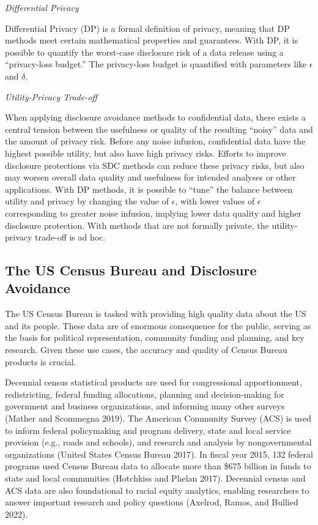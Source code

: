 \documentclass[
]{urban-formatting}
\begin{document}
\emph{Differential Privacy}

Differential Privacy (DP) is a formal definition of privacy, meaning
that DP methods meet certain mathematical properties and guarantees.
With DP, it is possible to quantify the worst-case disclosure risk of a
data release using a ``privacy-loss budget.'' The privacy-loss budget is
quantified with parameters like \(\epsilon\) and \(\delta\).

\emph{Utility-Privacy Trade-off}

When applying disclosure avoidance methods to confidential data, there
exists a central tension between the usefulness or quality of the
resulting ``noisy'' data and the amount of privacy risk. Before any
noise infusion, confidential data have the highest possible utility, but
also have high privacy risks. Efforts to improve disclosure protections
via SDC methods can reduce these privacy risks, but also may worsen
overall data quality and usefulness for intended analyses or other
applications. With DP methods, it is possible to ``tune'' the balance
between utility and privacy by changing the value of \(\epsilon\), with
lower values of \(\epsilon\) corresponding to greater noise infusion,
implying lower data quality and higher disclosure protection. With
methods that are not formally private, the utility-privacy trade-off is
ad hoc.

\subsection{The US Census Bureau and Disclosure Avoidance}

The US Census Bureau is tasked with providing high quality data about
the US and its people. These data are of enormous consequence for the
public, serving as the basis for political representation, community
funding and planning, and key research. Given these use cases, the
accuracy and quality of Census Bureau products is crucial.

Decennial census statistical products are used for congressional
apportionment, redistricting, federal funding allocations, planning and
decision-making for government and business organizations, and informing
many other surveys (Mather and Scommegna 2019). The American Community
Survey (ACS) is used to inform federal policymaking and program
delivery, state and local service provision (e.g., roads and schools),
and research and analysis by nongovernmental organizations (United
States Census Bureau 2017). In fiscal year 2015, 132 federal programs
used Census Bureau data to allocate more than \$675 billion in funds to
state and local communities (Hotchkiss and Phelan 2017). Decennial
census and ACS data are also foundational to racial equity analytics,
enabling researchers to answer important research and policy questions
(Axelrod, Ramos, and Bullied 2022).
\end{document}
